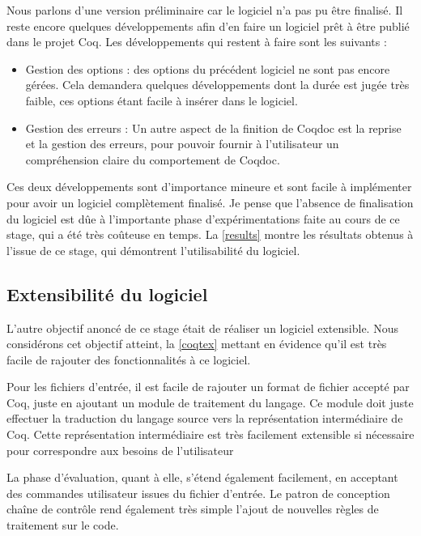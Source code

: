 \documentclass[a4paper, 11pt]{report}
\begin{document}
    Nous parlons d'une version préliminaire car le logiciel n'a pas pu être
    finalisé. Il reste encore quelques développements afin d'en faire un logiciel
    prêt à être publié dans le projet Coq. Les développements qui restent à faire
    sont les suivants :
    \begin{itemize}
      \item Gestion des options : des options du précédent logiciel ne
        sont pas encore gérées. Cela demandera quelques développements dont la
        durée est jugée très faible, ces options étant facile à insérer dans
        le logiciel.
      \item Gestion des erreurs : Un autre aspect de la finition de Coqdoc
        est la reprise et la gestion des erreurs, pour pouvoir fournir à
        l'utilisateur un compréhension claire du comportement de Coqdoc.
    \end{itemize}

    Ces deux développements sont d'importance mineure et sont facile à
    implémenter pour avoir un logiciel complètement finalisé.
    Je pense que l'absence de finalisation du logiciel est dûe à l'importante
    phase d'expérimentations faite au cours de ce stage, qui a été très
    coûteuse en temps. La \cref{results} montre les résultats obtenus à l'issue
    de ce stage, qui démontrent l'utilisabilité du logiciel.

    \subsection{Extensibilité du logiciel}
    L'autre objectif anoncé de ce stage était de réaliser un logiciel
    extensible. Nous considérons cet objectif atteint, la \cref{coqtex} mettant
    en évidence qu'il est très facile de rajouter des fonctionnalités à ce
    logiciel.

    Pour les fichiers d'entrée, il est facile de rajouter un format de fichier
    accepté par Coq, juste en ajoutant un module de traitement du langage. Ce
    module doit juste effectuer la traduction du langage source vers la
    représentation intermédiaire de Coq. Cette représentation intermédiaire est
    très facilement extensible si nécessaire pour correspondre aux besoins de
    l'utilisateur

    La phase d'évaluation, quant à elle, s'étend également facilement, en
    acceptant des commandes utilisateur issues du fichier d'entrée. Le patron
    de conception chaîne de contrôle rend également très simple l'ajout de
    nouvelles règles de traitement sur le code.
\end{document}

